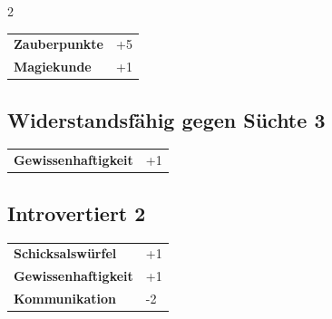 \begin{multicols}{2}
\begin{tcolorbox}
\vspace{3mm}

\begin{tabular}{@{}ll@{}}
    \textbf{Zauberpunkte} & +5\\
    \textbf{Magiekunde} & +1\\
\end{tabular}


\end{tcolorbox}

\begin{tcolorbox}
    \subsection*{Widerstandsfähig gegen Süchte \hfill \small{3 }}
    \tcblower




\begin{tabular}{@{}ll@{}}
    \textbf{Gewissenhaftigkeit} & +1\\
\end{tabular}


\end{tcolorbox}

\begin{tcolorbox}
    \subsection*{Introvertiert \hfill \small{2 }}
    \tcblower




\begin{tabular}{@{}ll@{}}
    \textbf{Schicksalswürfel} & +1\\
    \textbf{Gewissenhaftigkeit} & +1\\
    \textbf{Kommunikation} & -2\\
\end{tabular}


\end{tcolorbox}


\end{multicols}
